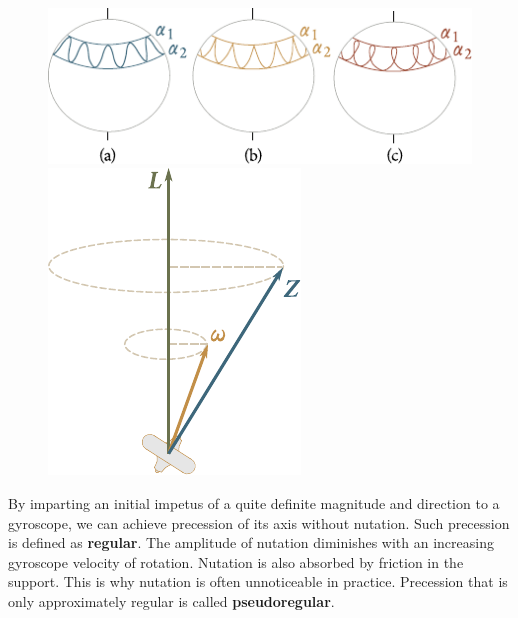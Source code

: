 \begin{figure}[t]
	\begin{minipage}[t]{0.6\linewidth}
		\begin{center}
			\includegraphics[scale=1]{figures/ch_05/fig_5_30.pdf}
			\caption[]{}
			\label{fig:5_30}
		\end{center}
	\end{minipage}
	\hspace{-0.05cm}
	\begin{minipage}[t]{0.36\linewidth}
		\begin{center}
			\includegraphics[scale=0.95]{figures/ch_05/fig_5_31.pdf}
			\caption[]{}
			\label{fig:5_31}
		\end{center}
	\end{minipage}
	\vspace{-0.4cm}
\end{figure}


By imparting an initial impetus of a quite definite magnitude and direction to a gyroscope, we can achieve precession of its axis without nutation. Such precession is defined as \textbf{regular}. The amplitude of nutation diminishes with an increasing gyroscope velocity of rotation. Nutation is also absorbed by friction in the support. This is why nutation is often unnoticeable in practice. Precession that is only approximately regular is called \textbf{pseudoregular}.


